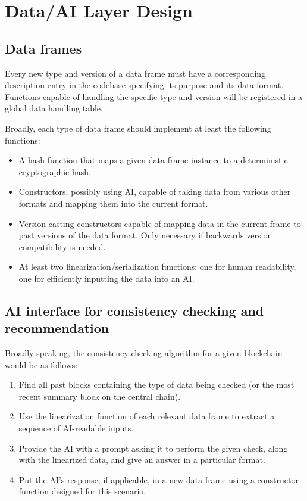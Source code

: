 \documentclass[12pt]{article}
\begin{document}
\section{Data/AI Layer Design}
\subsection{Data frames}
Every new type and version of a data frame must have a corresponding description entry in the codebase specifying its purpose and its data format. Functions capable of handling the specific type and version will be registered in a global data handling table.

Broadly, each type of data frame should implement at least the following functions:
\begin{itemize}
\item A hash function that maps a given data frame instance to a deterministic cryptographic hash.

\item Constructors, possibly using AI, capable of taking data from various other formats and mapping them into the current format.

\item Version casting constructors capable of mapping data in the current frame to past versions of the data format. Only necessary if backwards version compatibility is needed.

\item At least two linearization/serialization functions: one for human readability, one for efficiently inputting the data into an AI.
\end{itemize}


\subsection{AI interface for consistency checking and recommendation}
Broadly speaking, the consistency checking algorithm for a given blockchain would be as follows:
\begin{enumerate}
\item Find all past blocks containing the type of data being checked (or the most recent summary block on the central chain).

\item Use the linearization function of each relevant data frame to extract a sequence of AI-readable inputs.

\item Provide the AI with a prompt asking it to perform the given check, along with the linearized data, and give an answer in a particular format.

\item Put the AI's response, if applicable, in a new data frame using a constructor function designed for this scenario.
\end{enumerate}
\end{document}
